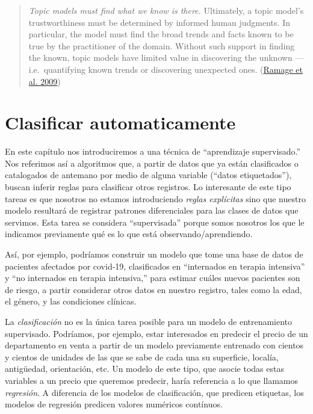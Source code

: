 \documentclass[
]{book}
\begin{document}
\begin{quote}
\emph{Topic models must find what we know is there.} Ultimately, a topic model's trustworthiness must be determined by informed human judgments. In particular, the model must find the broad trends and facts known to be true by the practitioner of the domain. Without such support in finding the known, topic models have limited value in discovering the unknown --- i.e.~quantifying known trends or discovering unexpected ones. (\protect\hyperlink{ref-Ramage2009}{Ramage et al. 2009})
\end{quote}

\hypertarget{clasificar-automaticamente}{%
\chapter{Clasificar automaticamente}\label{clasificar-automaticamente}}

En este capítulo nos introduciremos a una técnica de ``aprendizaje supervisado.'' Nos referimos así a algoritmos que, a partir de datos que ya están clasificados o catalogados de antemano por medio de alguna variable (``datos etiquetados''), buscan inferir reglas para clasificar otros registros.
Lo interesante de este tipo tareas es que nosotros no estamos introduciendo \emph{reglas explícitas} sino que nuestro modelo resultará de registrar patrones diferenciales para las clases de datos que servimos.
Esta tarea se considera ``supervisada'' porque somos nosotros los que le indicamos previamente qué es lo que está observando/aprendiendo.

Así, por ejemplo, podríamos construir un modelo que tome una base de datos de pacientes afectados por covid-19, clasificados en ``internados en terapia intensiva'' y ``no internados en terapia intensiva,'' para estimar cuáles nuevos pacientes son de riesgo, a partir considerar otros datos en nuestro registro, tales como la edad, el género, y las condiciones clínicas.

La \emph{clasificación} no es la única tarea posible para un modelo de entrenamiento supervisado. Podríamos, por ejemplo, estar interesados en predecir el precio de un departamento en venta a partir de un modelo previamente entrenado con cientos y cientos de unidades de las que se sabe de cada una su superficie, localía, antigüedad, orientación, etc. Un modelo de este tipo, que asocie todas estas variables a un precio que queremos predecir, haría referencia a lo que llamamos \emph{regresión}. A diferencia de los modelos de clasificación, que predicen etiquetas, los modelos de regresión predicen valores numéricos contínuos.
\end{document}
